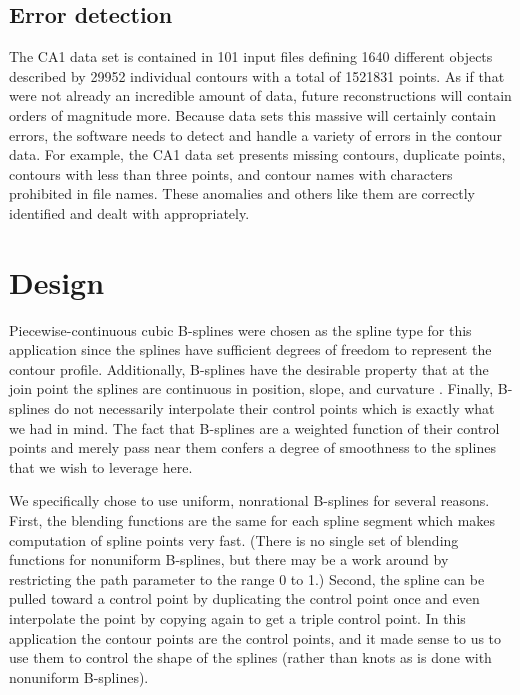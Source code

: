 \documentclass[12pt]{article}
\begin{document}
\subsection{Error detection}

The CA1 data set is contained in 101 input files defining 1640 different
objects described by 29952 individual contours with a total of 1521831
points. As if that were not already an incredible amount of data, future
reconstructions will contain orders of magnitude more. Because data
sets this massive will certainly contain errors, the software needs to
detect and handle a variety of errors in the contour data. For example,
the CA1 data set presents missing contours, duplicate points, contours
with less than three points, and contour names with characters prohibited
in file names. These anomalies and others like them are correctly
identified and dealt with appropriately.

\section{Design}

Piecewise-continuous cubic B-splines were chosen as the spline type for
this application since the splines have sufficient degrees of freedom to
represent the contour profile. Additionally, B-splines have the desirable
property that at the join point the splines are continuous in position,
slope, and curvature \cite{cgpp-2ed-1995}. Finally, B-splines do not
necessarily interpolate their control points which is exactly what we
had in mind. The fact that B-splines are a weighted function of their
control points and merely pass near them confers a degree of smoothness
to the splines that we wish to leverage here.

We specifically chose to use uniform, nonrational B-splines for several
reasons. First, the blending functions are the same for each spline
segment which makes computation of spline points very fast. (There is
no single set of blending functions for nonuniform B-splines, but there
may be a work around by restricting the path parameter to the range 0 to
1.) Second, the spline can be pulled toward a control point by duplicating
the control point once and even interpolate the point by copying again to
get a triple control point. In this application the contour points are the
control points, and it made sense to us to use them to control the shape
of the splines (rather than knots as is done with nonuniform B-splines).
\end{document}
